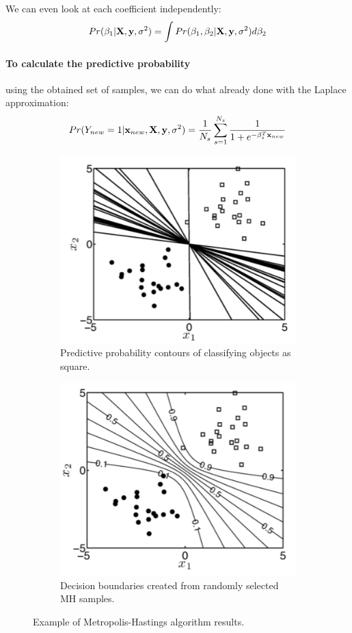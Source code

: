 We can even look at each coefficient independently:
\begin{equation}
Pr(\mathbf{\beta}_1|\mathrm{\mathbf{X}},\mathbf{y},\sigma^2) = \int Pr(\mathbf{\beta}_1,\mathbf{\beta}_2|\mathrm{\mathbf{X}},\mathbf{y},\sigma^2) d\mathbf{\beta}_2
\end{equation}

\paragraph{\textbf{To calculate the predictive probability}} using the obtained set of samples, we can do what already done with the Laplace approximation:
\begin{equation}
Pr(Y_{new}=1|\mathbf{x}_{new}, \mathrm{\mathbf{X}},\mathbf{y},\sigma^2) = \frac{1}{N_s} \sum_{s=1}^{N_s} \frac{1}{1+e^{-\mathbf{\beta}^T_s \mathbf{x}_{new}}}
\end{equation}

\begin{figure}
\begin{subfigure}{.47\textwidth}
\centering
\includegraphics[width=.8\linewidth]{img/MH1}
\caption{Predictive probability contours of classifying objects as square.}
\label{MH1}
\end{subfigure}
\begin{subfigure}{.47\textwidth}
\centering
\includegraphics[width=.8\linewidth]{img/MH2}
\caption{Decision boundaries created from randomly selected MH samples.}
\label{MH2}
\end{subfigure}
\caption{Example of Metropolis-Hastings algorithm results.}
\end{figure}
